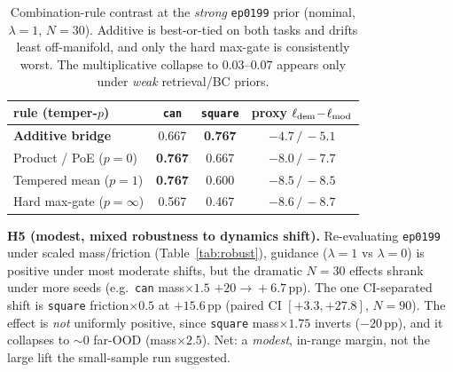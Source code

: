 \documentclass[letterpaper, 10 pt, conference]{ieeeconf}
\begin{document}
\begin{table}[h]
\centering\scriptsize
\setlength{\tabcolsep}{4pt}
\renewcommand{\arraystretch}{0.95}
\caption{Combination-rule contrast at the \emph{strong} \texttt{ep0199}
prior (nominal, $\lambda\!=\!1$, $N\!=\!30$). Additive is best-or-tied on
both tasks and drifts least off-manifold, and only the hard max-gate is
consistently worst. The multiplicative collapse to $0.03$--$0.07$ appears
only under \emph{weak} retrieval/BC priors.}
\label{tab:rules}
\begin{tabular}{@{}lccc@{}}
\hline
rule (temper-$p$) & \texttt{can} & \texttt{square} & proxy $\ell_{\rm dem}\!-\!\ell_{\rm mod}$ \\
\hline
\textbf{Additive bridge}        & 0.667          & \textbf{0.767} & $\mathbf{-4.7\,/\,-5.1}$ \\
Product / PoE ($p\!=\!0$)       & \textbf{0.767} & 0.667          & $-8.0\,/\,-7.7$ \\
Tempered mean ($p\!=\!1$)       & \textbf{0.767} & 0.600          & $-8.5\,/\,-8.5$ \\
Hard max-gate ($p\!=\!\infty$)  & 0.567          & 0.467          & $-8.6\,/\,-8.7$ \\
\hline
\end{tabular}
\end{table}

\textbf{H5 (modest, mixed robustness to dynamics shift).} Re-evaluating
\texttt{ep0199} under scaled mass/friction (Table~\ref{tab:robust}),
guidance ($\lambda\!=\!1$ vs $\lambda\!=\!0$) is positive under most moderate shifts,
but the dramatic $N\!=\!30$ effects shrank under more seeds (e.g.\ \texttt{can}
mass$\times1.5$ $+20\!\to\!+6.7$\,pp). The one CI-separated shift is
\texttt{square} friction$\times0.5$ at $\mathbf{+15.6}$\,pp (paired CI
$[+3.3,+27.8]$, $N\!=\!90$). The effect is \emph{not} uniformly
positive, since \texttt{square} mass$\times1.75$ inverts ($-20$\,pp), and it
collapses to $\sim\!0$ far-OOD (mass$\times2.5$). Net: a \emph{modest},
in-range margin, not the large lift the small-sample run suggested.
\end{document}
